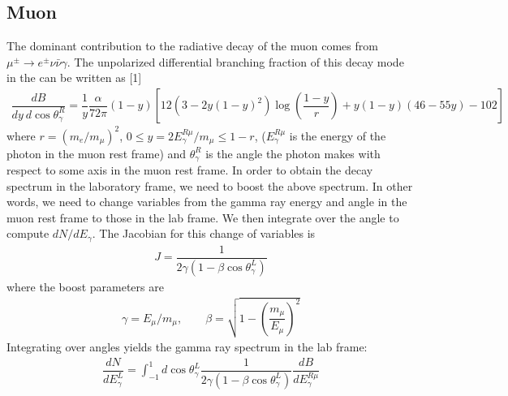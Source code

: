 \documentclass[letterpaper,10pt,english]{sphinxmanual}
\let\sphinxpxdimen\pdfpxdimen\else\newdimen\sphinxpxdimen
\begin{document}
\subsection{Muon}
\label{\detokenize{description:muon}}
The dominant contribution to the radiative decay of the muon comes from \(\mu^{\pm}\to e^{\pm}\nu\bar{\nu}\gamma\). The unpolarized differential branching fraction of this decay mode in the  can be written as
{[}1{]}
\begin{equation*}
\begin{split}\dfrac{dB}{dy \ d\cos\theta_{\gamma}^{R}} = \dfrac{1}{y}
\dfrac{\alpha}{72\pi}(1-y)\left[
12\left(3 - 2y(1-y)^2\right)\log\left(\dfrac{1-y}{r}\right)
+ y(1-y)(46 - 55y) - 102\right]\end{split}
\end{equation*}
where \(r = (m_{e}/m_{\mu})^2\), \(0 \leq y = 2E_{\gamma}^{R\mu}/m_{\mu} \leq 1 - r\), (\(E_{\gamma}^{R\mu}\) is the energy of the photon in the muon rest frame) and \(\theta_{\gamma}^{R}\) is the angle the photon makes with respect to some axis in the muon rest frame.  In order to obtain the decay spectrum in the laboratory frame, we need to boost the above spectrum. In other words, we need to change variables from the gamma ray energy and angle in the muon rest frame to those in the lab frame. We then integrate over the angle to compute \(dN/dE_{\gamma}\). The Jacobian for this change of variables is
\begin{equation*}
\begin{split}J = \dfrac{1}{2\gamma(1-\beta\cos\theta_{\gamma}^{L})}\end{split}
\end{equation*}
where the boost parameters are
\begin{equation*}
\begin{split}\gamma = E_{\mu} / m_{\mu}, \qquad \beta = \sqrt{1 - \left(\dfrac{m_{\mu}}{E_{\mu}}\right)^2}\end{split}
\end{equation*}
Integrating over angles yields the gamma ray spectrum in the lab frame:
\begin{equation*}
\begin{split}\dfrac{dN}{dE_{\gamma}^{L}} =
\int_{-1}^{1}d\cos\theta_{\gamma}^{L}
\dfrac{1}{2\gamma(1-\beta\cos\theta_{\gamma}^{L})}
\dfrac{dB}{dE_{\gamma}^{R\mu}}\end{split}
\end{equation*}
\noindent{\hspace*{\fill}\sphinxincludegraphics[width=400\sphinxpxdimen,height=400\sphinxpxdimen]{{muon_decay_spectra}.png}\hspace*{\fill}}
\end{document}
